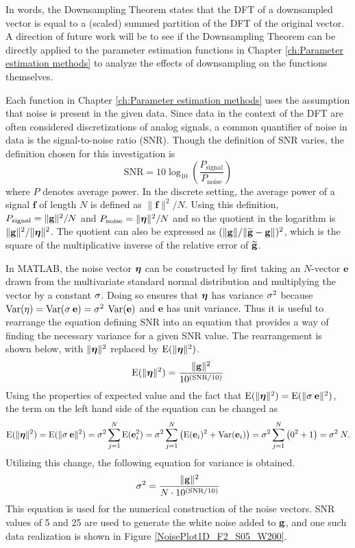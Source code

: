 In words, the Downsampling Theorem states that the DFT of a downsampled vector is equal to a (scaled) summed partition of the DFT of the original vector. A direction of future work will be to see if the Downsampling Theorem can be directly applied to the parameter estimation functions in Chapter \ref{ch:Parameter estimation methods} to analyze the effects of downsampling on the functions themselves. \par 
Each function in Chapter \ref{ch:Parameter estimation methods} uses the assumption that noise is present in the given data. Since data in the context of the DFT are often considered discretizations of analog signals, a common quantifier of noise in data is the signal-to-noise ratio (SNR). Though the definition of SNR varies, the definition chosen for this investigation is
\begin{equation}
\label{eq:SNR}
\text{SNR} = 10\log_{10}\left(\frac{P_{\text{signal}}}{P_{\text{noise}}}\right)
\end{equation}
where $P$ denotes average power. In the discrete setting, the average power of a signal $\mathbf{f}$ of length $N$ is defined as $\|\mathbf{f}\|^2/N$. Using this definition, $P_{\text{signal}} = \|\mathbf{g}\|^2/N$ and $P_{\text{noise}} = \|\bm{\eta}\|^2/N$ and so the quotient in the logarithm is $\|\mathbf{g}\|^2/\|\bm{\eta}\|^2$. The quotient can also be expressed as $(\|\mathbf{g}\|/\|\widetilde{\mathbf{g}} - \mathbf{g}\|)^2$, which is the square of the multiplicative inverse of the relative error of $\widetilde{\mathbf{g}}$. \par
In MATLAB, the noise vector $\bm{\eta}$ can be constructed by first taking an $N$-vector $\mathbf{e}$ drawn from the multivariate standard normal distribution and multiplying the vector by a constant $\sigma$. Doing so ensures that $\bm{\eta}$ has variance $\sigma^2$ because $\operatorname{Var}(\eta) = \operatorname{Var}(\sigma\:\mathbf{e}) = \sigma^2\:\operatorname{Var}(\mathbf{e})$ and $\mathbf{e}$ has unit variance. Thus it is useful to rearrange the equation defining SNR into an equation that provides a way of finding the necessary variance for a given SNR value. The rearrangement is shown below, with $\|\bm{\eta}\|^2$ replaced by $\operatorname{E}(\|\bm{\eta}\|^2)$.
\[\operatorname{E}(\|\bm{\eta}\|^2) = \frac{\|\mathbf{g}\|^2}{10^{(\text{SNR}/10)}}\]
Using the properties of expected value and the fact that $\operatorname{E}(\|\bm{\eta}\|^2) = \operatorname{E}(\|\sigma\:\mathbf{e}\|^2)$, the term on the left hand side of the equation can be changed as
\[\operatorname{E}(\|\bm{\eta}\|^2) = \operatorname{E}(\|\sigma\:\mathbf{e}\|^2) = \sigma^2 \sum_{j=1}^N \operatorname{E}(\mathbf{e}_i^2) = \sigma^2 \sum_{j=1}^N \left(\operatorname{E}(\mathbf{e}_i)^2 + \operatorname{Var}(\mathbf{e}_i)\right) = \sigma^2 \sum_{j=1}^N \left(0^2 + 1\right) = \sigma^2\:N.\]
Utilizing this change, the following equation for variance is obtained.
\begin{equation}
\label{eq:Var}
\sigma^2 = \frac{\|\mathbf{g}\|^2}{N \cdot 10^{(\text{SNR}/10)}}
\end{equation}
This equation is used for the numerical construction of the noise vectors. SNR values of 5 and 25 are used to generate the white noise added to $\mathbf{g}$, and one such data realization is shown in Figure \ref{NoisePlot1D_F2_S05_W200}. \par


